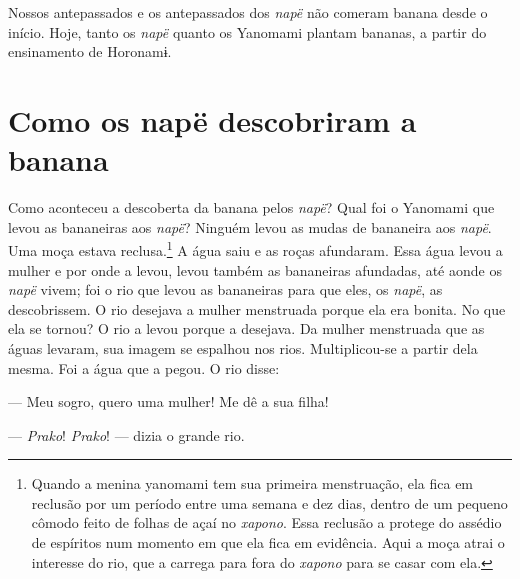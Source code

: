 
Nossos antepassados e os antepassados dos \textit{napë} não comeram banana
desde o início. Hoje, tanto os \textit{napë} quanto os Yanomami plantam
bananas, a partir do ensinamento de Horonamɨ.

\section{Como os napë descobriram a banana}

Como aconteceu a descoberta da banana pelos \textit{napë}? Qual foi o
Yanomami que levou as bananeiras aos \textit{napë}? Ninguém levou as mudas
de bananeira aos \textit{napë}. Uma moça estava reclusa.\footnote{Quando a menina yanomami tem sua primeira menstruação, ela fica em
reclusão por um período entre uma semana e dez dias, dentro de um
pequeno cômodo feito de folhas de açaí no \textit{xapono}. Essa reclusão a
protege do assédio de espíritos num momento em que ela fica em
evidência. Aqui a moça atrai o interesse do rio, que a carrega para fora
do \textit{xapono} para se casar com ela.} A água saiu
e as roças afundaram. Essa água levou a mulher e por onde a levou, levou
também as bananeiras afundadas, até aonde os \textit{napë} vivem; foi o
rio que levou as bananeiras para que eles, os \textit{napë}, as
descobrissem. O rio desejava a mulher menstruada porque ela era bonita.
No que ela se tornou? O rio a levou porque a desejava. Da mulher
menstruada que as águas levaram, sua imagem se espalhou nos rios.
Multiplicou-se a partir dela mesma. Foi a água que a pegou. O rio
disse: 

--- Meu sogro, quero uma mulher! Me dê a sua filha! 


--- \textit{Prako}! \textit{Prako}! --- dizia o grande rio. 


